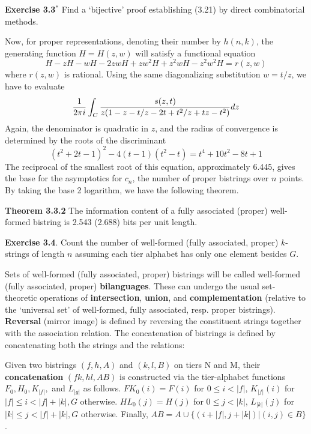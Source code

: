 \smallskip\noindent
{\bf Exercise 3.3$^*$} Find a `bijective' proof establishing (3.21) 
by direct combinatorial methods.

Now, for proper representations, denoting their number by $h(n,k)$, the
generating function $H=H(z,w)$ will satisfy a functional equation
\begin{equation}
H-zH-wH-2zwH +zw^2H+z^2wH-z^2w^2H= r(z,w)
\end{equation}
where $r(z,w)$ is rational. Using the same diagonalizing substitution
$w=t/z$, we have to evaluate
\begin{equation}
{1\over {2 \pi i}} \int_{C}{s(z,t) \over
z(1-z-t/z -2t+t^2/z+tz-t^2)}dz
\end{equation}
Again, the denominator is quadratic in $z$, and the radius of
convergence is determined by the roots of the discriminant
\begin{equation}
{(t^2+2t-1)}^2-4(t-1)(t^2-t)=t^4+10t^2-8t+1
\end{equation}
The reciprocal of the smallest root of this equation, approximately
6.445, gives the base for the asymptotics for $c_n$, the number of
proper bistrings over $n$ points. By taking the base 2 logarithm, we have
the following theorem.

\smallskip\noindent
{\bf Theorem 3.3.2} The information content of a fully associated
(proper) well-formed bistring is 2.543 (2.688) bits per unit length.

\smallskip\noindent
{\bf Exercise 3.4}. Count the number of well-formed (fully associated,
proper) $k$-strings of length $n$ assuming each tier alphabet has only 
one element besides $G$.

Sets of well-formed (fully associated, proper) bistrings will be called
well-formed (fully associated, proper) {\bf bilanguages}. These can undergo
the usual set-theoretic operations of {\bf intersection}, {\bf union}, and {\bf
complementation} (relative to the `universal set' of well-formed, fully
associated, resp. proper bistrings).  {\bf Reversal} (mirror image) is defined
by reversing the constituent strings together with the association relation.
 The concatenation of bistrings is defined by concatenating 
both the strings and the relations: 

\smallskip{} Given two bistrings $(f,h,A)$ and
$(k,l,B)$ on tiers N and M, their {\bf concatenation} $(fk,hl,AB)$ is
constructed via the tier-alphabet functions $F_0, H_0, K_{|f|},$ and $L_{|g|}$
as follows. $FK_0(i)=F(i)$ for $0 \leq i<|f|$, $K_{|f|}(i)$ for $|f| \leq i <
|f|+|k|, G$ otherwise. $HL_0(j)=H(j)$ for $0 \leq j<|k|$, $L_{|k|}(j)$ for
$|k| \leq j < |f|+|k|, G$ otherwise. Finally, $AB = A \cup \{(i+|f|,j+|k|) |
(i,j) \in B\}$.

